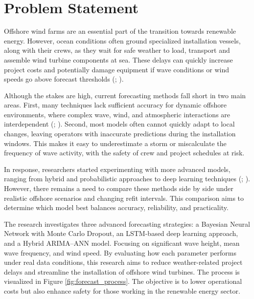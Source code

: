 \section{Problem Statement}
Offshore wind farms are an essential part of the transition towards renewable energy. However, ocean conditions often ground specialized installation vessels, along with their crews, as they wait for safe weather to load, transport and assemble wind turbine components at sea. These delays can quickly increase project costs and potentially damage equipment if wave conditions or wind speeds go above forecast thresholds (\cite{Boccaletti2019}; \cite{Kelley2018}).

Although the stakes are high, current forecasting methods fall short in two main areas. First, many techniques lack sufficient accuracy for dynamic offshore environments, where complex wave, wind, and atmospheric interactions are interdependent (\cite{Murphy1993}; \cite{Wilks2011}). Second, most models often cannot quickly adapt to local changes, leaving operators with inaccurate predictions during the installation windows. This makes it easy to underestimate a storm or miscalculate the frequency of wave activity, with the safety of crew and project schedules at risk.

In response, researchers started experimenting with more advanced models, ranging from hybrid and probabilistic approaches to deep learning techniques (\cite{Zhang2019}; \cite{Huang2020}). However, there remains a need to compare these methods side by side under realistic offshore scenarios and changing refit intervals. This comparison aims to determine which model best balances accuracy, reliability, and practicality.

 The research investigates three advanced forecasting strategies: a Bayesian Neural Network with Monte Carlo Dropout, an LSTM-based deep learning approach, and a Hybrid ARIMA–ANN model. Focusing on significant wave height, mean wave frequency, and wind speed. By evaluating how each parameter performs under real data conditions, this research aims to reduce weather-related project delays and streamline the installation of offshore wind turbines. The process is visualized in Figure \ref{fig:forecast_process}. The objective is to lower operational costs but also enhance safety for those working in the renewable energy sector. 

